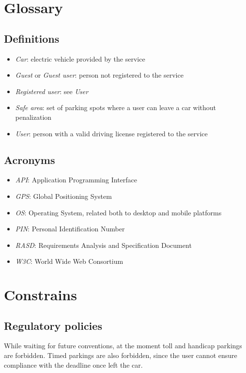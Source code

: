 \section{Glossary}

\subsection{Definitions}
\begin{itemize}
	\item \emph{Car}: electric vehicle provided by the service
	\item \emph{Guest} or \emph{Guest user}: person not registered to the service
	\item \emph{Registered user}: see \emph{User}
	\item \emph{Safe area}: set of parking spots where a user can leave a car without penalization 
	\item \emph{User}: person with a valid driving license registered to the service
\end{itemize}

\subsection{Acronyms}
\begin{itemize}
	\item \emph{API}: Application Programming Interface
	\item \emph{GPS}: Global Positioning System
	\item \emph{OS}: Operating System, related both to desktop and mobile platforms
	\item \emph{PIN}: Personal Identification Number
	\item \emph{RASD}: Requirements Analysis and Specification Document
	\item \emph{W3C}: World Wide Web Consortium
\end{itemize}

\section{Constrains}

\subsection{Regulatory policies}
While waiting for future conventions, at the moment toll and handicap parkings are forbidden. Timed parkings are also forbidden, since the user cannot ensure compliance with the deadline once left the car.

